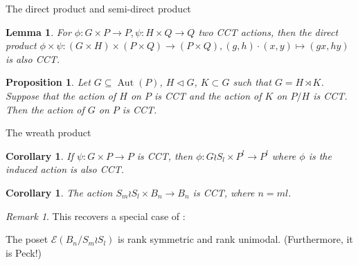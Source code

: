 \documentclass{beamer}
\newtheorem{cor}[thm]{Corollary}
\newtheorem{lem}[thm]{Lemma}
\newtheorem{prop}[thm]{Proposition}
\theoremstyle{remark}
\newtheorem{rem}[thm]{Remark}
\begin{document}
\begin{frame}{The direct product and semi-direct product}
\begin{lem}
\label{thm:direct_product_preservation}
For $\phi:G\times P\rightarrow P,\psi:H \times Q \rightarrow Q$ two CCT actions, then the direct product $\phi \times \psi:(G\times H)\times (P\times Q) \rightarrow (P\times Q),(g,h)\cdot (x,y) \mapsto (gx,hy)$ is also CCT.
\end{lem}





\begin{prop}\label{prop:semidirect_product_cover_transitive_actions}
Let $G\subseteq \operatorname{Aut}(P)$, $H\triangleleft G$, $K\subset G$ such that $G = H\rtimes K$.  Suppose that the action of $H$ on $P$ is CCT and the action of $K$ on $P/H$ is CCT.  Then the action of $G$ on $P$ is CCT.
\end{prop}
\end{frame}





\begin{frame}{The wreath product}
\begin{cor}
\label{thm:wreath_preservation}
If $\psi:G\times P \rightarrow P$ is CCT, then $\phi:G\wr S_l \times P^l \rightarrow P^l$ where $\phi$ is the induced action is also CCT.
\end{cor}
\pause
\begin{cor}
The action $S_m \wr S_l \times B_{n} \rightarrow B_{n}$ is CCT, where $n =ml$.
\end{cor}
\pause
\begin{rem}
This recovers a special case of \cite[Theorem 1.1]{pak}: 

The poset $\mathcal E (B_n/S_m \wr S_l)$ is rank symmetric and rank unimodal. (Furthermore, it is Peck!)
\end{rem}
\end{frame}





\end{document}
